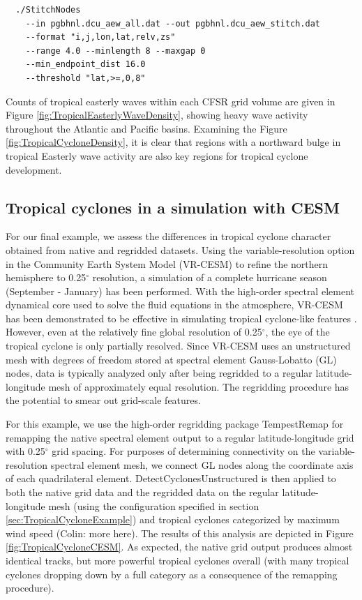 \documentclass[gmdd, hvmath, online]{copernicus_discussions}
\begin{document}
{\small \begin{verbatim}
  ./StitchNodes
    --in pgbhnl.dcu_aew_all.dat --out pgbhnl.dcu_aew_stitch.dat
    --format "i,j,lon,lat,relv,zs"
    --range 4.0 --minlength 8 --maxgap 0
    --min_endpoint_dist 16.0
    --threshold "lat,>=,0,8"
\end{verbatim}}

Counts of tropical easterly waves within each CFSR grid volume are given in Figure \ref{fig:TropicalEasterlyWaveDensity}, showing heavy wave activity throughout the Atlantic and Pacific basins.  Examining the Figure \ref{fig:TropicalCycloneDensity}, it is clear that regions with a northward bulge in tropical Easterly wave activity are also key regions for tropical cyclone development.

\subsection{Tropical cyclones in a simulation with CESM} \label{sec:TropicalCycloneCESM}

For our final example, we assess the differences in tropical cyclone character obtained from native and regridded datasets.  {\color{red}Using the variable-resolution option in the Community Earth System Model (VR-CESM) to refine the northern hemisphere to 0.25$^\circ$ resolution, a simulation of a complete hurricane season (September - January) has been performed}.  With the high-order spectral element dynamical core used to solve the fluid equations in the atmosphere, VR-CESM has been demonstrated to be effective in simulating tropical cyclone-like features \citep{zarzycki2014multidecadal, zarzycki2014using}.  However, even at the relatively fine global resolution of 0.25$^\circ$, the eye of the tropical cyclone is only partially resolved.  Since VR-CESM uses an unstructured mesh with degrees of freedom stored at spectral element Gauss-Lobatto (GL) nodes, data is typically analyzed only after being regridded to a regular latitude-longitude mesh of approximately equal resolution.  The regridding procedure has the potential to smear out grid-scale features.

For this example, we use the high-order regridding package TempestRemap \citep{ullrich2015arbitrary, ullrich2016arbitrary} for remapping the native spectral element output to a regular latitude-longitude grid with 0.25$^\circ$ grid spacing.  For purposes of determining connectivity on the variable-resolution spectral element mesh, we connect GL nodes along the coordinate axis of each quadrilateral element.  DetectCyclonesUnstructured is then applied to both the native grid data and the regridded data on the regular latitude-longitude mesh (using the configuration specified in section \ref{sec:TropicalCycloneExample}) and tropical cyclones categorized by maximum wind speed {\color{red}(Colin: more here)}.  The results of this analysis are depicted in Figure \ref{fig:TropicalCycloneCESM}.  As expected, the native grid output produces  almost identical tracks, but more powerful tropical cyclones overall (with many tropical cyclones dropping down by a full category as a consequence of the remapping procedure).
\end{document}
